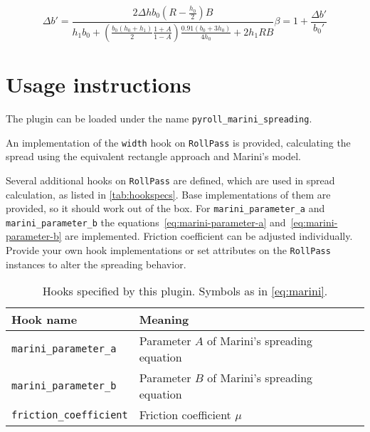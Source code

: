 \documentclass[11pt]{PyRollDocs}
\begin{document}
    \begin{subequations}
        \begin{equation}
            \Delta b' = \frac{2 \Delta h b_0 \left( R - \frac{h_0}{2} \right) B }{h_1 b_0 + \left( \frac{b_0 \left( h_0 + h_1 \right)}{2} \frac{1 + A}{1 - A} \right) \frac{0.91 \left( b_0 + 3 h_0 \right)}{4 h_0} + 2 h_1 R B}
            \label{eq:delta-b}
        \end{equation}
        \begin{equation}
        \beta = 1 + \frac{\Delta b'}{b_0'}
        \label{eq:spread-reformulated}
    \end{equation}
    \end{subequations}


    \section{Usage instructions}\label{sec:usage-instructions}

    The plugin can be loaded under the name \texttt{pyroll\_marini\_spreading}.

    An implementation of the \lstinline{width} hook on \lstinline{RollPass} is provided,
    calculating the spread using the equivalent rectangle approach and Marini's model.

    Several additional hooks on \lstinline{RollPass} are defined, which are used in spread calculation, as listed in \autoref{tab:hookspecs}.
    Base implementations of them are provided, so it should work out of the box.
    For \lstinline{marini_parameter_a} and \lstinline{marini_parameter_b} the equations~\ref{eq:marini-parameter-a} and~\ref{eq:marini-parameter-b} are implemented.
    Friction coefficient can be adjusted individually.
    Provide your own hook implementations or set attributes on the \lstinline{RollPass} instances to alter the spreading behavior.

    \begin{table}
        \centering
        \caption{Hooks specified by this plugin. Symbols as in \autoref{eq:marini}.}
        \label{tab:hookspecs}
        \begin{tabular}{ll}
            \toprule
            Hook name                     & Meaning                                      \\
            \midrule
            \texttt{marini\_parameter\_a}   & Parameter $A$ of Marini's spreading equation \\
            \texttt{marini\_parameter\_b}   & Parameter $B$ of Marini's spreading equation \\
            \texttt{friction\_coefficient} & Friction coefficient $\mu$                   \\
            \bottomrule
        \end{tabular}
    \end{table}

    \printbibliography
\end{document}
